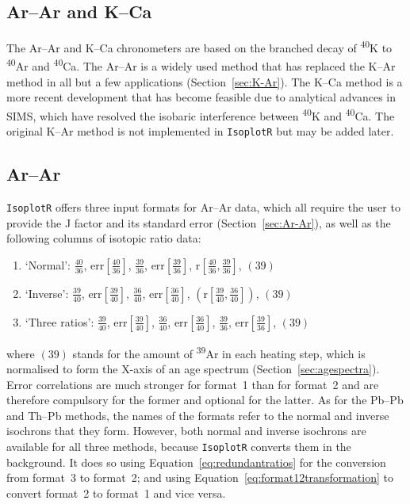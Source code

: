 \begin{refsection}

\chapter{Ar--Ar and K--Ca}\label{ch:ArArKCa}

The Ar--Ar and K--Ca chronometers are based on the branched decay of
\textsuperscript{40}K to \textsuperscript{40}Ar and
\textsuperscript{40}Ca. The Ar--Ar is a widely used method that has
replaced the K--Ar method in all but a few applications
(Section~\ref{sec:K-Ar}). The K--Ca method is a more recent
development that has become feasible due to analytical advances in
SIMS, which have resolved the isobaric interference between
\textsuperscript{40}K and \textsuperscript{40}Ca. The original K--Ar
method is not implemented in \texttt{IsoplotR} but may be added later.

\section{Ar--Ar}\label{sec:ArAr}

\texttt{IsoplotR} offers three input formats for Ar--Ar data, which
all require the user to provide the J factor and its standard error
(Section~\ref{sec:Ar-Ar}), as well as the following columns of
isotopic ratio data:
\begin{enumerate}
\item{`Normal':}
  $\frac{40}{36}$,  
  $\mbox{err}\!\left[\frac{40}{36}\right]$, 
  $\frac{39}{36}$,  
  $\mbox{err}\!\left[\frac{39}{36}\right]$,  
  $\mbox{r}\!\left[\frac{40}{36},\frac{39}{36}\right]$,
  $\left(39\right)$
\item{`Inverse':}
  $\frac{39}{40}$,  
  $\mbox{err}\!\left[\frac{39}{40}\right]$, 
  $\frac{36}{40}$,  
  $\mbox{err}\!\left[\frac{36}{40}\right]$,  
  $\left(\mbox{r}\!\left[\frac{39}{40},\frac{36}{40}\right]\right)$,
  $\left(39\right)$
\item{`Three ratios':}
  $\frac{39}{40}$,  
  $\mbox{err}\!\left[\frac{39}{40}\right]$, 
  $\frac{36}{40}$,  
  $\mbox{err}\!\left[\frac{36}{40}\right]$,  
  $\frac{39}{36}$,  
  $\mbox{err}\!\left[\frac{39}{36}\right]$,
  $\left(39\right)$
\end{enumerate}

\noindent where $(39)$ stands for the amount of \textsuperscript{39}Ar
in each heating step, which is normalised to form the X-axis of an age
spectrum (Section~\ref{sec:agespectra}). Error correlations are much
stronger for format~1 than for format~2 and are therefore compulsory
for the former and optional for the latter. As for the Pb--Pb and
Th--Pb methods, the names of the formats refer to the normal and
inverse isochrons that they form. However, both normal and inverse
isochrons are available for all three methods, because
\texttt{IsoplotR} converts them in the background. It does so using
Equation~\ref{eq:redundantratios} for the conversion from format~3 to
format~2; and using Equation~\ref{eq:format12transformation} to
convert format~2 to format~1 and vice versa.\\


\end{refsection}
